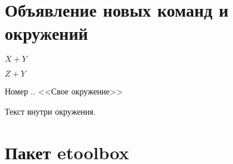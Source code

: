 \section{Объявление новых команд и окружений}
\newcommand{\nw}{\ensuremath{\succcurlyeq}}

\newcommand{\customcommand}[2][X]{
    $#1 + #2$
}

\customcommand{Y}
\customcommand[Z]{Y}


\newenvironment{customenv}[1]{
    \addtocounter{customcounter}{1}%
    Номер \thesection.. <<#1>> %
}%
{\vspace{0cm}} %

\begin{customenv}{Свое окружение}
    Текст внутри окружения.
\end{customenv}

\section{Пакет etoolbox}


\listoffigures

\listoftables

\printbibliography


